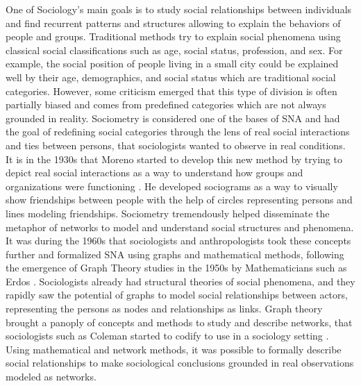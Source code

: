 One of Sociology's main goals is to study social relationships between individuals and find recurrent patterns and structures allowing to explain the behaviors of people and groups.
Traditional methods try to explain social phenomena using classical social classifications such as age, social status, profession, and sex.
For example, the social position of people living in a small city could be explained well by their age, demographics, and social status which are traditional social categories.
However, some criticism emerged that this type of division is often partially biased and comes from predefined categories which are not always grounded in reality.
Sociometry is considered one of the bases of SNA and had the goal of redefining social categories through the lens of real social interactions and ties between persons, that sociologists wanted to observe in real conditions.
It is in the 1930s that Moreno started to develop this new method by trying to depict real social interactions as a way to understand how groups and organizations were functioning \cite{morenoFoundationsSociometryIntroduction1941}.
He developed sociograms as a way to visually show friendships between people with the help of circles representing persons and lines modeling friendships.
Sociometry tremendously helped disseminate the metaphor of networks to model and understand social structures and phenomena.
It was during the 1960s that sociologists and anthropologists took these concepts further and formalized SNA using graphs and mathematical methods, following the emergence of Graph Theory studies in the 1950s by Mathematicians such as Erdos \cite{erdos2011}.
Sociologists already had structural theories of social phenomena, and they rapidly saw the potential of graphs to model social relationships between actors, representing the persons as nodes and relationships as links.
Graph theory brought a panoply of concepts and methods to study and describe networks, that sociologists such as Coleman started to codify to use in a sociology setting \cite{colemanIntroductionMathematicalSociology1964}.
Using mathematical and network methods, it was possible to formally describe social relationships to make sociological conclusions grounded in real observations modeled as networks.


